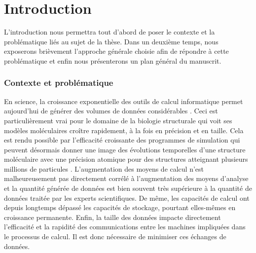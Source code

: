 
\chapter*{Introduction} %
\mtcaddchapter
{} %
\mtcaddpart
{}  %

L'introduction nous permettra tout d'abord de poser le contexte et la problématique liés au sujet de la thèse. Dans un deuxième temps, nous exposerons brièvement l'approche générale choisie afin de répondre à cette problématique et enfin nous présenterons un plan général du manuscrit.

\subsection*{Contexte et problématique}

En science, la croissance exponentielle des outils de calcul informatique permet aujourd'hui de générer des volumes de données considérables \style.   Ceci est particulièrement vrai pour le domaine de la biologie structurale qui voit ses modèles moléculaires croître rapidement, à la fois en précision et en taille. Cela est rendu possible par l'efficacité croissante des programmes de simulation qui peuvent désormais donner une image des évolutions temporelles d'une structure moléculaire avec une précision atomique pour des structures atteignant plusieurs millions de particules \style. L'augmentation des moyens de calcul n'est malheureusement pas directement corrélé à l'augmentation des moyens d'analyse et la quantité générée de données est bien souvent très supérieure à la quantité de données traitée par les experts scientifiques. De même, les capacités de calcul ont depuis longtemps dépassé les capacités de stockage, pourtant elles-mêmes en croissance permanente. Enfin, la taille des données impacte directement l'efficacité et la rapidité des communications entre les machines impliquées dans le processus de calcul. Il est donc nécessaire de minimiser ces échanges de données. 

